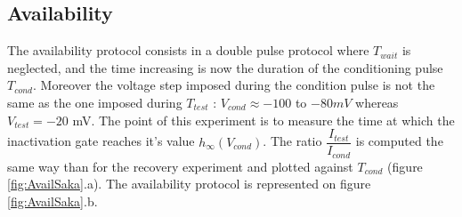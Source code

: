 \documentclass[11pt]{report}
\begin{document}
\subsection{Availability}

The availability protocol consists in a double pulse protocol where $T_{wait}$ is neglected, and the time increasing is now the duration of the conditioning pulse $T_{cond}$. Moreover the voltage step imposed during the condition pulse is not the same as the one imposed during $T_{test}$ : $V_{cond} \approx -100$ to $-80 mV$ whereas $V_{test} = -20$ mV. The point of this experiment is to measure the time at which the inactivation gate reaches it's value $h_{\infty}(V_{cond})$. The ratio $\dfrac{I_{test}}{I_{cond}}$ is computed the same way than for the recovery experiment and plotted against $T_{cond}$ (figure \ref{fig:AvailSaka}.a). The availability protocol is represented on figure \ref{fig:AvailSaka}.b.
\end{document}

